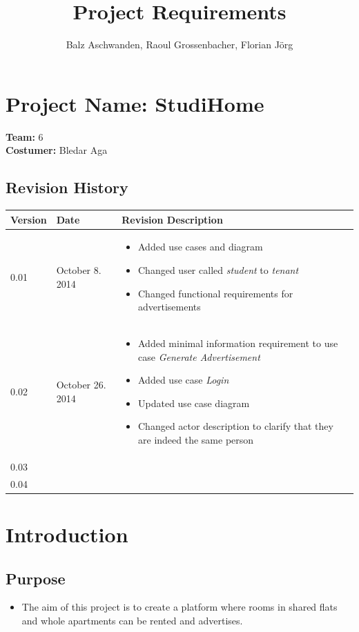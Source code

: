 \documentclass[a4paper,11pt]{article}
\title{Project Requirements}
\author{Balz Aschwanden, Raoul Grossenbacher, Florian Jörg}
\begin{document}
\maketitle
\section*{Project Name: StudiHome}

\textbf{Team:} 6 \\
\textbf{Costumer:} Bledar Aga \\

\subsection*{Revision History}
\begin{tabular}{|p{1.2cm}|p{3cm}|p{8cm}|} \hline
  Version & Date & Revision Description \\ \hline
  0.01 & October 8. 2014 &
  \begin{itemize}
  	\item Added use cases and diagram
  	\item Changed user called \textit{student} to \textit{tenant}
  	\item Changed functional requirements for advertisements
  \end{itemize} \\ \hline
  0.02 & October 26. 2014 & 
  \begin{itemize}
  	\item Added minimal information requirement to use case \textit{Generate Advertisement}
  	\item Added use case \textit{Login}
  	\item Updated use case diagram
  	\item Changed actor description to clarify that they are indeed the same person
  \end{itemize} \\ \hline
  0.03 & & \\ \hline
  0.04 & & \\ \hline
\end{tabular}

\section{Introduction}

\subsection*{Purpose}
\begin{itemize}
  \item The aim of this project is to create a platform where rooms in shared flats and whole apartments can be rented and advertises.
\end{itemize}
\end{document}
